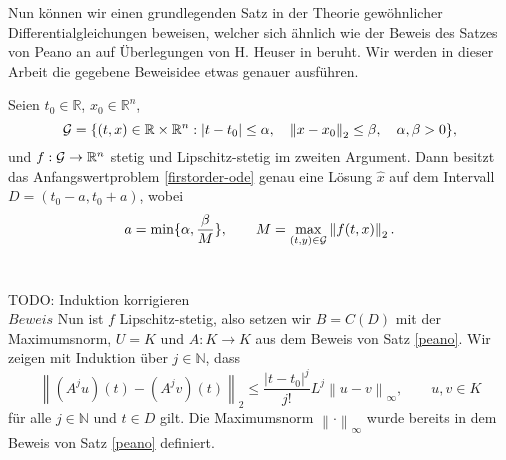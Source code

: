 Nun können wir einen grundlegenden Satz in der Theorie gewöhnlicher Differentialgleichungen beweisen, welcher sich
ähnlich wie der Beweis des Satzes von Peano an auf Überlegungen von H. Heuser in
\cite{harroheuserGewohnlicheDifferentialgleichungen} beruht. Wir werden in dieser Arbeit die gegebene Beweisidee etwas
genauer ausführen.
\begin{satz}
\label{picard}
    Seien $t_0 \in \mathbb{R}$, $x_0 \in \mathbb{R}^n$,
    \[
        {\cal G}=\{(t,x) \in \mathbb{R} \times \mathbb{R}^{n}: |t-t_{0}| \leq \alpha, \quad
        \left\lVert x-x_{0} \right\rVert_2 \leq\beta, \quad \alpha,\beta > 0 \},
    \]
    und $f:{\cal G} \rightarrow \mathbb{R}^{n}$ stetig und Lipschitz-stetig im zweiten Argument.
    Dann besitzt das Anfangswertproblem \eqref{firstorder-ode} genau eine Lösung $\hat{x}$ auf dem Intervall
    $D=(t_{0}-a,t_{0}+a)$, wobei
    \[
        a=\min\{\alpha, \frac{\beta}{M}\}, \qquad M= \max_{(t,y)\in {\cal G}}\left\lVert f(t,x)\right\rVert_2 .
    \]\\
\end{satz}
TODO: Induktion korrigieren \\
$Beweis$ Nun ist $f$ Lipschitz-stetig, also setzen wir $B=C(D)$ mit der Maximumsnorm, $U=K$ und $A:K \rightarrow K$
aus dem Beweis von Satz \eqref{peano}. Wir zeigen mit Induktion über $j\in \mathbb{N}$, dass
\[
    \left\lVert (A^j u)(t) - (A^j v)(t) \right\rVert_2 \leq \frac{|t-t_0|^j}{j!} L^j\left\lVert u - v \right\rVert_{\infty},
    \qquad u,v \in K
\]
für alle $j \in \mathbb{N}$ und $t \in D$ gilt. Die Maximumsnorm $\left\lVert \cdot \right\rVert_{\infty}$ wurde
bereits in dem Beweis von Satz \eqref{peano} definiert.
